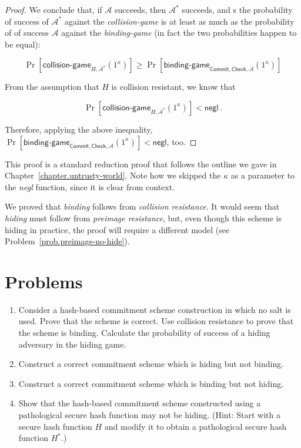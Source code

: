 \begin{proof}
  We conclude that, if $\mathcal{A}$ succeeds, then $\mathcal{A}^*$ succeeds, and s
  the probability of success of $\mathcal{A}^*$ against the \emph{collision-game}
  is at least as much as the probability of of success $\mathcal{A}$ against the \emph{binding-game}
  (in fact the two probabilities happen to be equal):

  \[
    \Pr[\textsf{collision-game}_{H,\mathcal{A}^*}(1^\kappa)] \geq
    \Pr[\textsf{binding-game}_{\textsf{Commit},\textsf{Check},\mathcal{A}}(1^\kappa)]
  \]

  From the assumption that $H$ is collision resistant, we know that

  \[
    \Pr[\textsf{collision-game}_{H,\mathcal{A}^*}(1^\kappa)] < \textsf{negl}\,.
  \]

  Therefore, applying the above inequality,
  $\Pr[\textsf{binding-game}_{\textsf{Commit},\textsf{Check},\mathcal{A}}(1^\kappa)] < \textsf{negl}$,
  too.
\end{proof}

This proof is a standard reduction proof that follows the outline we gave in Chapter~\ref{chapter.untrusty-world}.
Note how we skipped the $\kappa$ as a parameter to the \emph{negl} function, since it is clear
from context.

We proved that \emph{binding} follows from \emph{collision resistance}. It would seem that
\emph{hiding} must follow from \emph{preimage resistance}, but, even though this scheme is
hiding in practice, the proof will require a different model (see Problem~\ref{prob.preimage-no-hide}).

\section*{Problems}

\begin{enumerate}
  \item Consider a hash-based commitment scheme construction in which no salt is used.
        Prove that the scheme is correct. Use collision resistance to prove that the scheme is binding.
        Calculate the probability of success of a hiding adversary in the
        hiding game.\label{prob.commit-salt}
  \item Construct a correct commitment scheme which is hiding but not binding.
  \item Construct a correct commitment scheme which is binding but not hiding.
  \item Show that the hash-based commitment scheme constructed using a
        pathological secure hash function may not be hiding.
        (Hint: Start with a secure hash function $H$ and modify it
         to obtain a pathological secure hash function $H^*$.)\label{prob.preimage-no-hide}
\end{enumerate}
